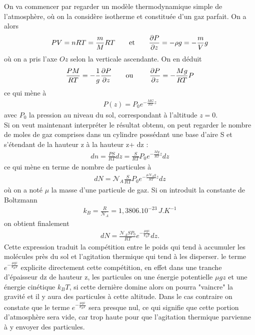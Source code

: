\documentclass[12pt,prb,aps,epsf]{article}
\begin{document}
On va commencer par regarder un modèle thermodynamique simple de l'atmosphère, où on la considère isotherme et constituée d'un gaz parfait. On a alors 
\begin{eqnarray}
PV = nRT = \frac{m}{M}RT\hspace{0.7cm}\mathrm{et}\hspace{0.7cm}\frac{\partial P}{\partial z} = - \rho g = -\frac{m}{V}g
\end{eqnarray}
où on a pris l'axe $Oz$ selon la verticale ascendante. On en déduit 
\begin{eqnarray}
\frac{PM}{RT} = -\frac{1}{g}\frac{\partial P}{\partial z}\hspace{0.7cm}\mathrm{ou}\hspace{0.7cm}\ \frac{\partial P}{\partial z} = - \frac{Mg}{RT} P
\end{eqnarray}
ce qui mène à 
\begin{eqnarray}
P(z) = P_0e^{-\frac{MG}{RT}z}
\end{eqnarray}
avec $P_0$ la pression au niveau du sol, correspondant à l'altitude $z=0$.\\
Si on veut maintenant interpréter le résultat obtenu, on peut regarder le nombre de moles de gaz comprises dans un cylindre possédant une base d'aire S et s'étendant de la hauteur z à la hauteur z+ dz :
\begin{eqnarray}
dn = \frac{PS}{RT}dz = \frac{S}{RT} P_0e^{-\frac{Mg}{RT}z} dz
\end{eqnarray}
ce qui mène en terme de nombre de particules à 
\begin{eqnarray}
dN = \mathcal{N}_A\frac{S}{RT} P_0e^{-\frac{\mu\mathcal{N}_Ag}{RT}z} dz
\end{eqnarray}
où on a noté $\mu$ la masse d'une particule de gaz. Si on introduit la constante de Boltzmann 
\begin{eqnarray}
k_B = \frac{R}{\mathcal{N}_A} = 1,3806.10^{-23}\,J.K^{-1}
\end{eqnarray}
on obtient finalement 
\begin{eqnarray}
dN = \frac{\mathcal{N}_ASP_0}{RT} e^{-\frac{\mu g z}{k_BT}} dz.
\end{eqnarray}
Cette expression traduit la compétition entre le poids qui tend à accumuler les molécules près du sol et l'agitation thermique qui tend à les disperser. le terme $e^{-\frac{\mu g z}{k_BT}}$ explicite directement cette compétition, en effet dans une tranche d'épaisseur dz de hauteur z, les particules on une énergie potentielle $\mu g z$ et une énergie cinétique $k_BT$, si cette dernière domine alors on pourra "vaincre" la gravité et il y aura des particules à cette altitude. Dans le cas contraire on constate que le terme $e^{-\frac{\mu g z}{k_BT}}$ sera presque nul, ce qui signifie que cette portion d'atmosphère sera vide, car trop haute pour que l'agitation thermique parvienne à y envoyer des particules.\\
\end{document}
